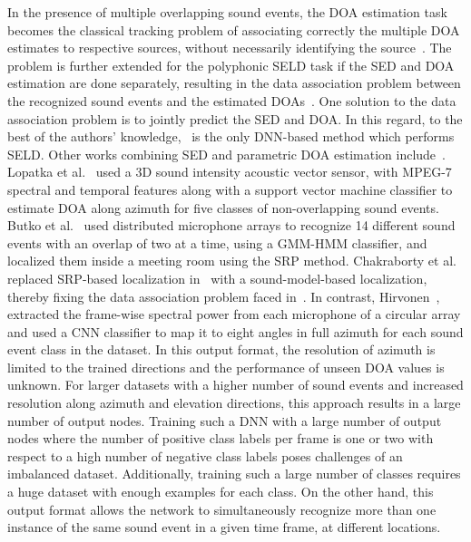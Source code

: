 \documentclass[journal]{IEEEtran}
\begin{document}
In the presence of multiple overlapping sound events, the DOA estimation task becomes the classical tracking problem of associating correctly the multiple DOA estimates to respective sources, without necessarily identifying the source~\cite{valin2007robust, traa2014multiple}. The problem is further extended for the polyphonic SELD task if the SED and DOA estimation are done separately, resulting in the data association problem between the recognized sound events and the estimated DOAs~\cite{Butko2011}. One solution to the data association problem is to jointly predict the SED and DOA. In this regard, to the best of the authors' knowledge,~\cite{Hirvonen2015} is the only DNN-based method which performs SELD.  Other works combining SED and parametric DOA estimation include~\cite{Grobler2017,Butko2011, Chakraborty_ICASSP2014, Lopatka2016}. Lopatka et al.~\cite{Lopatka2016} used a 3D sound intensity acoustic vector sensor, with MPEG-7 spectral and temporal features along with a support vector machine classifier to estimate DOA along azimuth for five classes of non-overlapping sound events. Butko et al.~\cite{Butko2011} used distributed microphone arrays to recognize 14 different sound events with an overlap of two at a time, using a GMM-HMM classifier, and localized them inside a meeting room using the SRP method. Chakraborty et al.~\cite{Chakraborty_ICASSP2014} replaced SRP-based localization in~\cite{Butko2011} with a sound-model-based localization, thereby fixing the data association problem faced in~\cite{Butko2011}. In contrast, Hirvonen~\cite{Hirvonen2015}, extracted the frame-wise spectral power from each microphone of a circular array and used a CNN classifier to map it to eight angles in full azimuth for each sound event class in the dataset. In this output format, the resolution of azimuth is limited to the trained directions and the performance of unseen DOA values is unknown. For larger datasets with a higher number of sound events and increased resolution along azimuth and elevation directions, this approach results in a large number of output nodes. Training such a DNN with a large number of output nodes where the number of positive class labels per frame is one or two with respect to a high number of negative class labels poses challenges of an imbalanced dataset. Additionally, training such a large number of classes requires a huge dataset with enough examples for each class. On the other hand, this output format allows the network to simultaneously recognize more than one instance of the same sound event in a given time frame, at different locations. 
\end{document}
